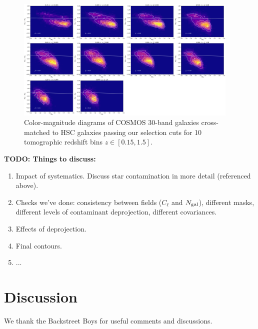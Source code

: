 \documentclass[a4paper,11pt]{article}
\newcommand{\todo}[1]{{\bf TODO: #1}}
\begin{document}
      \begin{figure}
        \begin{center}
          \includegraphics[width=0.95\textwidth]{figures/color-magnitude_cut=COSMOS30_nbin=10_weights=True.pdf}
          \caption{Color-magnitude diagrams of COSMOS 30-band galaxies cross-matched to HSC galaxies passing our selection cuts for 10 tomographic redshift bins $z \in [0.15, 1.5]$.}
          \label{fig:color-mag}
        \end{center}
      \end{figure}

      \todo{Things to discuss:}
      \begin{enumerate}
        \item Impact of systematics. Discuss star contamination in more detail (referenced above).
        \item Checks we've done: consistency between fields ($C_\ell$ and $N_{\rm gal}$), different masks, different levels of contaminant deprojection, different covariances.
        \item Effects of deprojection.
        \item Final contours.
        \item ...
      \end{enumerate}

\section{Discussion}\label{sec:discussion}
  \lipsum[9]

\acknowledgments

We thank the Backstreet Boys for useful comments and discussions.


\end{document}
